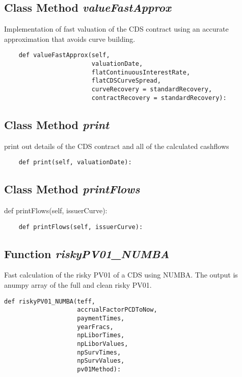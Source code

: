 \documentclass[twoside,11pt]{book}
\begin{document}
\subsection{Class Method {\it valueFastApprox}}
Implementation of fast valuation of the CDS contract using an accurate approximation that avoids curve building. 

\begin{lstlisting}
    def valueFastApprox(self,
                        valuationDate,
                        flatContinuousInterestRate,
                        flatCDSCurveSpread,
                        curveRecovery = standardRecovery,
                        contractRecovery = standardRecovery):
\end{lstlisting}

\subsection{Class Method {\it print}}
print out details of the CDS contract and all of the calculated cashflows 

\begin{lstlisting}
    def print(self, valuationDate):
\end{lstlisting}

\subsection{Class Method {\it printFlows}}
def printFlows(self, issuerCurve):

\begin{lstlisting}
    def printFlows(self, issuerCurve):
\end{lstlisting}

\subsection{Function {\it riskyPV01\_NUMBA}}
Fast calculation of the risky PV01 of a CDS using NUMBA. The output is anumpy array of the full and clean risky PV01.

\begin{lstlisting}
def riskyPV01_NUMBA(teff, 
                    accrualFactorPCDToNow,
                    paymentTimes,
                    yearFracs,
                    npLiborTimes,
                    npLiborValues,
                    npSurvTimes,
                    npSurvValues,
                    pv01Method):
\end{lstlisting}
\end{document}
